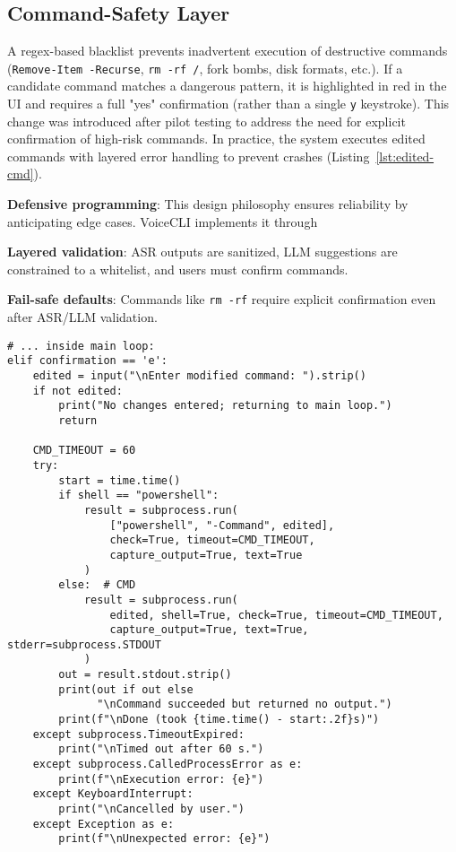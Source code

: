 \documentclass[a4paper,12pt]{article}
\begin{document}
\subsection{Command-Safety Layer}
\label{sec:command-safety}
\noindent A regex-based blacklist prevents inadvertent execution of destructive commands (\texttt{Remove-Item -Recurse}, \texttt{rm -rf /}, fork bombs, disk formats, etc.). If a candidate command matches a dangerous pattern, it is highlighted in red in the UI and requires a full "yes" confirmation (rather than a single \texttt{y} keystroke). This change was introduced after pilot testing to address the need for explicit confirmation of high-risk commands. In practice, the system executes edited commands with layered error handling to prevent crashes (Listing~\ref{lst:edited-cmd}).
\begin{description}
    \item \textbf{Defensive programming}: This design philosophy ensures reliability by anticipating edge cases. VoiceCLI implements it through~\cite{ref25} 
    \item\textbf{Layered validation}: ASR outputs are sanitized, LLM suggestions are constrained to a whitelist, and users must confirm commands.
    \item\textbf{Fail-safe defaults}: Commands like \texttt{rm -rf} require explicit confirmation even after ASR/LLM validation.
\end{description}

\newpage

\begin{lstlisting}[style=vscode,
                   caption={Edited-command execution with layered error handling},
                   label={lst:edited-cmd},
                   emph={subprocess,TimeoutExpired,CalledProcessError}]
# ... inside main loop:
elif confirmation == 'e':
    edited = input("\nEnter modified command: ").strip()
    if not edited:
        print("No changes entered; returning to main loop.")
        return

    CMD_TIMEOUT = 60
    try:
        start = time.time()
        if shell == "powershell":
            result = subprocess.run(
                ["powershell", "-Command", edited],
                check=True, timeout=CMD_TIMEOUT,
                capture_output=True, text=True
            )
        else:  # CMD
            result = subprocess.run(
                edited, shell=True, check=True, timeout=CMD_TIMEOUT,
                capture_output=True, text=True, stderr=subprocess.STDOUT
            )
        out = result.stdout.strip()
        print(out if out else
              "\nCommand succeeded but returned no output.")
        print(f"\nDone (took {time.time() - start:.2f}s)")
    except subprocess.TimeoutExpired:
        print("\nTimed out after 60 s.")
    except subprocess.CalledProcessError as e:
        print(f"\nExecution error: {e}")
    except KeyboardInterrupt:
        print("\nCancelled by user.")
    except Exception as e:
        print(f"\nUnexpected error: {e}")
\end{lstlisting}
\end{document}
